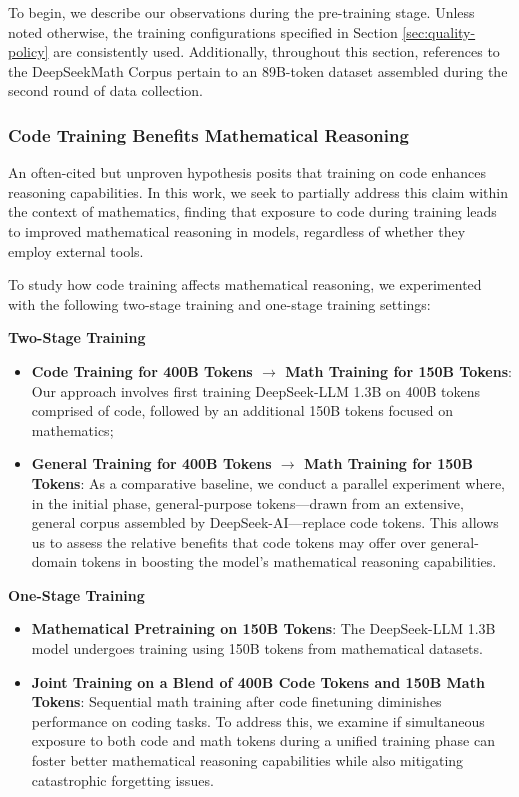 \begin{itemize}[topsep=0pt]
To begin, we describe our observations during the pre-training stage. Unless noted otherwise, the training configurations specified in Section \ref{sec:quality-policy} are consistently used. Additionally, throughout this section, references to the DeepSeekMath Corpus pertain to an 89B-token dataset assembled during the second round of data collection.

\subsubsection{Code Training Benefits Mathematical Reasoning}

An often-cited but unproven hypothesis posits that training on code enhances reasoning capabilities. In this work, we seek to partially address this claim within the context of mathematics, finding that exposure to code during training leads to improved mathematical reasoning in models, regardless of whether they employ external tools.

To study how code training affects mathematical reasoning, we experimented with the following two-stage training and one-stage training settings:

\textbf{Two-Stage Training}

\begin{itemize}[topsep=0pt]
    \item \textbf{Code Training for 400B Tokens $\rightarrow$ Math Training for 150B Tokens}: Our approach involves first training DeepSeek-LLM 1.3B on 400B tokens comprised of code, followed by an additional 150B tokens focused on mathematics;
    \item \textbf{General Training for 400B Tokens $\rightarrow$ Math Training for 150B Tokens}: As a comparative baseline, we conduct a parallel experiment where, in the initial phase, general-purpose tokens—drawn from an extensive, general corpus assembled by DeepSeek-AI—replace code tokens. This allows us to assess the relative benefits that code tokens may offer over general-domain tokens in boosting the model’s mathematical reasoning capabilities.
\end{itemize}

\textbf{One-Stage Training}

\begin{itemize}[topsep=0pt]
    \item \textbf{Mathematical Pretraining on 150B Tokens}: The DeepSeek-LLM 1.3B model undergoes training using 150B tokens from mathematical datasets.
    \item \textbf{Joint Training on a Blend of 400B Code Tokens and 150B Math Tokens}: Sequential math training after code finetuning diminishes performance on coding tasks. To address this, we examine if simultaneous exposure to both code and math tokens during a unified training phase can foster better mathematical reasoning capabilities while also mitigating catastrophic forgetting issues.
\end{itemize}


\end{itemize}
